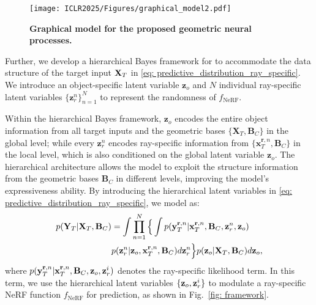 \begin{figure}[htbp]
\centering
\texttt{[image: ICLR2025/Figures/graphical\_model2.pdf]} 
\caption{\textbf{Graphical model for the proposed geometric neural processes.}}
\label{fig: graphical_model}
\end{figure}

Further, we develop a hierarchical Bayes framework for \method{} to accommodate the data structure of the target input ${\bf{X}}_{T}$ in \cref{eq: predictive_distribution_ray_specific}.
We introduce an object-specific latent variable $\mathbf{z}_o$ and $N$ individual ray-specific latent variables $\{\mathbf{z}_r^{n}\}_{n=1}^{N}$ to represent the randomness of $f_\text{NeRF}$.


Within the hierarchical Bayes framework, $\mathbf{z}_o$ encodes the entire object information from all target inputs and the geometric bases $\{\mathbf{X}_T, \mathbf{B}_C\}$ in the global level; while every $\mathbf{z}_r^{n}$ encodes ray-specific information from $\{ \mathbf{x}_T^{\mathbf{r}, n}, \mathbf{B}_C\}$ in the local level, which is also conditioned on the global latent variable $\mathbf{z}_o$. 
The hierarchical architecture allows the model to exploit the structure information from the geometric bases $\mathbf{B}_C$ in different levels, improving the model's expressiveness ability.
By introducing the hierarchical latent variables in \cref{eq: predictive_distribution_ray_specific}, we model \method{} as:
{\small
\begin{equation}
\begin{aligned}
        p({\bf{Y}}_{T}| {\bf{X}}_{T}, {\bf{B}}_{C}) &= \int \prod_{n=1}^{N} \Big\{ \int p({\bf{y}}_{T}^{\mathbf{r}, n}| {\bf{x}}_{T}^{\mathbf{r}, n}, {\bf{B}}_{C}, {\bf{z}}_r^n,{\bf{z}}_o ) \\
        &p({\bf{z}}_{r}^n| {\bf{z}}_o,  {\bf{x}}_{T}^{\mathbf{r}, n}, {\bf{B}}_C) d {\bf{z}}_r^n \Big\} p({\bf{z}}_o |{\bf{X}}_T, {\bf{B}}_C) d {\bf{z}}_o,
\end{aligned}
\label{eq:ganp-model}
\end{equation}
}where $p({\bf{y}}_{T}^{\mathbf{r}, n}| {\bf{x}}_{T}^{\mathbf{r}, n}, {\bf{B}}_{C}, {\bf{z}}_o, {\bf{z}}_r^i)$ denotes the ray-specific likelihood term. In this term, we use the hierarchical latent variables $\{{\bf{z}}_o, {\bf{z}}_r^i\}$ to modulate a ray-specific NeRF function $f_{\text{NeRF}}$ for prediction, as shown in Fig.~\ref{fig: framework}.
